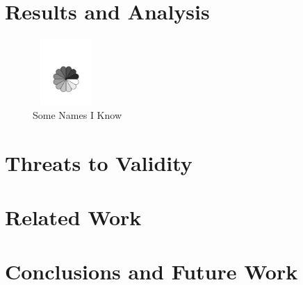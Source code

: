 \documentclass{acm_proc_article-sp}
\begin{document}
\section{Results and Analysis}


\begin{figure}
\centering
\includegraphics[height=1in, width=1in]{images/rosette.pdf}
\caption{Some Names I Know}
\end{figure}

\section{Threats to Validity}


\section{Related Work}


\section{Conclusions and Future Work}




\balancecolumns
\end{document}
